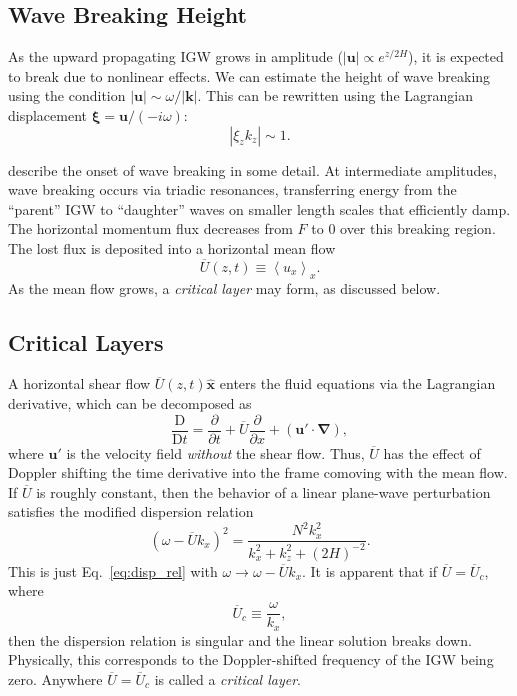 \documentclass[
        fleqn,
        usenatbib,
    ]{mnras}
\newcommand*{\pd}[2]{\frac{\partial#1}{\partial#2}}
\newcommand*{\md}[2]{\frac{\mathrm{D}#1}{\mathrm{D}#2}}
\newcommand*{\abs}[1]{\left|#1\right|}
\newcommand*{\ev}[1]{\left\langle#1\right\rangle}
\newcommand*{\p}[1]{\left(#1\right)}
\newcommand*{\bm}[1]{\mathbf{#1}}
\newcommand*{\uv}[1]{\hat{\mathbf{#1}}}
\begin{document}
\subsection{Wave Breaking Height}\label{ss:wave_breaking}

As the upward propagating IGW grows in amplitude ($\abs{\bm{u}} \propto
e^{z/2H}$), it is expected to break due to nonlinear effects. We can estimate
the height of wave breaking using the condition $\abs{\bm{u}} \sim \omega /
\abs{\bm{k}}$. This can be rewritten using the Lagrangian displacement
$\boldsymbol{\xi} = \bm{u} / \p{-i\omega}$:
\begin{equation}
    \abs{\xi_z k_z} \sim 1.\label{eq:nl}
\end{equation}

\citet{drazin, klostermeyer, winters1994} describe the onset of wave breaking in
some detail. At intermediate amplitudes, wave breaking occurs via triadic
resonances, transferring energy from the ``parent'' IGW to ``daughter'' waves on
smaller length scales that efficiently damp. The horizontal momentum flux
decreases from $F$ to $0$ over this breaking region. The lost flux is deposited
into a horizontal mean flow
\begin{equation}
    \overline{U}(z, t) \equiv \ev{u_x}_x.\label{eq:mean_flow}
\end{equation}
As the mean flow grows, a \emph{critical layer} may form, as discussed below.

\subsection{Critical Layers}\label{ss:crit_layer}

A horizontal shear flow $\overline{U}(z, t)\uv{x}$ enters the fluid equations
via the Lagrangian derivative, which can be decomposed as
\begin{equation}
    \md{}{t} = \pd{}{t} + \overline{U} \pd{}{x} + \p{\bm{u}' \cdot \bm{\nabla}},
\end{equation}
where $\bm{u}'$ is the velocity field \emph{without} the shear flow. Thus,
$\overline{U}$ has the effect of Doppler shifting the time derivative into the
frame comoving with the mean flow. If $\overline{U}$ is roughly constant, then
the behavior of a linear plane-wave perturbation satisfies the modified
dispersion relation
\begin{equation}
    \p{\omega - \overline{U}k_x}^2 =
        \frac{N^2k_{x}^2}{k_{x}^2 + k_{z}^2 + \p{2H}^{-2}}.
        \label{eq:disp_rel_U}
\end{equation}
This is just Eq.~\eqref{eq:disp_rel} with $\omega \to \omega - \overline{U}
k_x$. It is apparent that if $\overline{U} = \overline{U}_c$, where
\begin{equation}
    \overline{U}_c \equiv \frac{\omega}{k_x},\label{eq:u_crit}
\end{equation}
then the dispersion relation is singular and the linear solution breaks down.
Physically, this corresponds to the Doppler-shifted frequency of the IGW being
zero. Anywhere $\overline{U} = \overline{U}_c$ is called a \emph{critical
layer}.
\end{document}
